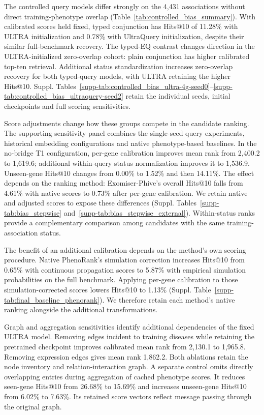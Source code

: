 \documentclass[webpdf,contemporary,large]{oup-authoring-template}%
\theoremstyle{thmstyleone}%
\theoremstyle{thmstyletwo}%
\theoremstyle{thmstylethree}%
\begin{document}
The controlled query models differ strongly on the 4{,}431 associations without
direct training-phenotype overlap (Table~\ref{tab:controlled_bias_summary}).
With calibrated scores held fixed, typed conjunction has Hits@10 of 11.28\%
with ULTRA initialization and 0.78\% with UltraQuery initialization, despite
their similar full-benchmark recovery. The typed-EQ contrast changes direction
in the ULTRA-initialized zero-overlap cohort: plain conjunction has higher
calibrated top-ten retrieval. Additional status standardization increases
zero-overlap recovery for both typed-query models, with ULTRA retaining the
higher Hits@10. Suppl. Tables~\ref{supp-tab:controlled_bias_ultra-4g-seed0}--\ref{supp-tab:controlled_bias_ultraquery-seed2}
retain the individual seeds, initial checkpoints and full scoring sensitivities.



Score adjustments change how these groups compete in the candidate ranking.
The supporting sensitivity panel combines the single-seed query experiments,
historical embedding configurations and native phenotype-based baselines.
In the no-bridge T1 configuration, per-gene calibration improves mean rank
from 2{,}400.2 to 1{,}619.6; additional within-query status normalization
improves it to 1{,}536.9. Unseen-gene Hits@10 changes from 0.00\% to 1.52\%
and then 14.11\%. The effect depends on the ranking method: Exomiser-Phive's
overall Hits@10 falls from 4.61\% with native scores to 0.73\% after per-gene
calibration. We retain native and adjusted scores to expose these differences
(Suppl. Tables~\ref{supp-tab:bias_stepwise} and~\ref{supp-tab:bias_stepwise_external}). Within-status ranks provide a complementary
comparison among candidates with the same training-association status.

The benefit of an additional calibration depends on the method's own scoring
procedure. Native PhenoRank's simulation correction increases Hits@10 from
0.65\% with continuous propagation scores to 5.87\% with empirical simulation
probabilities on the full benchmark. Applying per-gene calibration to those
simulation-corrected scores lowers Hits@10 to 1.13\%
(Suppl. Table~\ref{supp-tab:final_baseline_phenorank}). We therefore retain
each method's native ranking alongside the additional transformations.

Graph and aggregation sensitivities identify additional dependencies of the
fixed ULTRA model. Removing edges incident to training diseases while retaining
the pretrained checkpoint improves calibrated mean rank from 2{,}130.1 to
1{,}965.8. Removing expression edges gives mean rank 1{,}862.2. Both ablations
retain the node inventory and relation-interaction graph. A separate control
omits directly overlapping entries during aggregation of cached phenotype
scores. It reduces seen-gene Hits@10 from 26.68\% to 15.69\% and increases
unseen-gene Hits@10 from 6.02\% to 7.63\%. Its retained score vectors reflect
message passing through the original graph.
\end{document}

